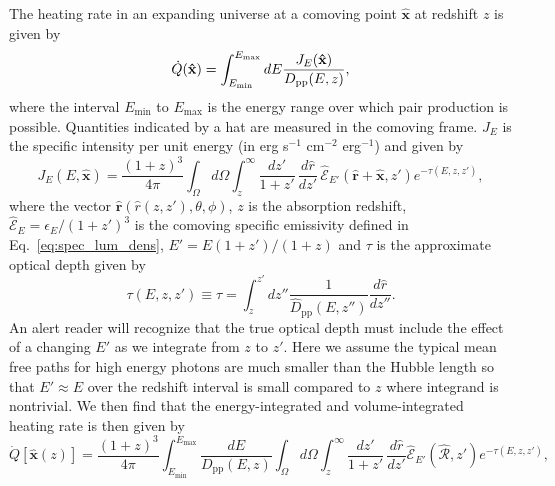 \documentclass[numberedappendix]{emulateapj}
\begin{document}
{The heating rate in an expanding universe at a comoving point $\mathbf{\hat{x}}$ at redshift $z$ is given by
\begin{equation}
  \dot{Q}(\mathbf{\hat{x}})= \int_{E_{\rm min}}^{E_{\rm max}} dE \frac{J_E(\mathbf{\hat{x}})}{D_{\mathrm{pp}}(E, z)},
\end{equation}
where the interval $E_{\mathrm{min}}$ to $E_{\mathrm{max}}$ is the energy range over which pair
production is possible. Quantities indicated by a hat are measured in the
comoving frame.
$J_E$ is the specific intensity per unit energy (in erg s$^{-1}$ cm$^{-2}$ erg$^{-1}$) and given by
\begin{equation}\label{eq:expanding J}
  J_E(E, \mathbf{\hat{x}}) = \frac {(1 + z)^3} {4\pi} \int_{\Omega} d\Omega \int_z^{\infty} \frac{d z'}{1+z'}\,\frac{d\hat{r}}{dz'}\, {\hat{\mathcal{E}}_{E'}(\mathbf{\hat{r}}+\mathbf{\hat{x}}, z')}e^{-\tau(E,z,z')},
\end{equation}
where the vector $\mathbf{\hat{r}}(\hat{r}(z,z'), \theta, \phi)$, $z$ is the absorption redshift, $\hat{\mathcal{E}}_E = \epsilon_E/(1+z')^3$ is the comoving specific emissivity defined in Eq.~\eqref{eq:spec_lum_dens}, $E' = E (1+z')/(1+z)$ and $\tau$ is the approximate optical depth given by
\begin{equation}
\label{eq:tau}
\tau(E,z,z')\equiv \tau=\int_z^{z'}dz''\frac{1}{\hat D_{\mathrm{pp}}(E,z'')}\frac{d\hat r}{dz''}.
\end{equation}
An alert reader will recognize that the true optical depth must include the effect of a changing $E'$ as we integrate from $z$ to $z'$.  Here we assume the typical mean free paths for high energy photons are much smaller than the Hubble length so that $E' \approx E$ over the redshift interval is small compared to $z$  where integrand is nontrivial.  
We then find that the energy-integrated and volume-integrated heating rate is then given by 
\begin{equation}
  \label{eq:int_exp_heat}
  \dot{Q}[\mathbf{\hat{x}}(z)]=\frac{(1+z)^3}{4\pi }\int_{E_{\mathrm{min}}}^{E_{\mathrm{max}}} \frac{dE}{D_{\mathrm{pp}}(E,z)}\int_{\Omega}d\Omega\int_z^{\infty} \frac{d z'}{1+z'}\,\frac{d\hat r}{dz'}\mathcal{\hat E}_{E'}(\mathbf{\hat{\mathcal{R}}}, z') e^{-\tau(E,z,z')},

\end{equation}}
\end{document}
